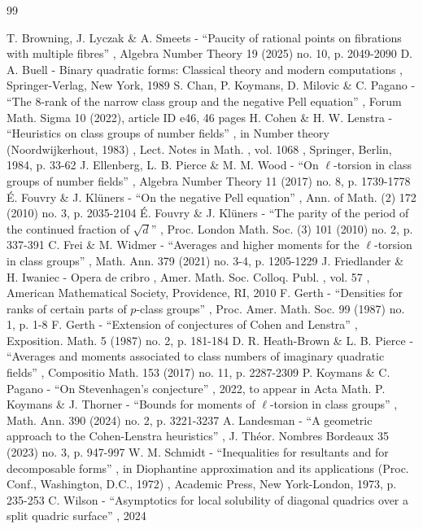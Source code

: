 \documentclass[11pt]{article}
\numberwithin{equation}{section}
\begin{document}
\begin{thebibliography}{99}\raggedright
{} T. Browning, J. Lyczak \& A. Smeets - “Paucity of rational points on fibrations with multiple fibres” , Algebra Number Theory 19 (2025) no. 10, p. 2049-2090
 D. A. Buell - Binary quadratic forms: Classical theory and modern computations , Springer-Verlag, New York, 1989
 S. Chan, P. Koymans, D. Milovic \& C. Pagano - “The 8-rank of the narrow class group and the negative Pell equation” , Forum Math. Sigma 10 (2022), article ID e46, 46 pages
 H. Cohen \& H. W. Lenstra - “Heuristics on class groups of number fields” , in Number theory (Noordwijkerhout, 1983) , Lect. Notes in Math. , vol. 1068 , Springer, Berlin, 1984, p. 33-62
 J. Ellenberg, L. B. Pierce \& M. M. Wood - “On $\ell $-torsion in class groups of number fields” , Algebra Number Theory 11 (2017) no. 8, p. 1739-1778
 É. Fouvry \& J. Klüners - “On the negative Pell equation” , Ann. of Math. (2) 172 (2010) no. 3, p. 2035-2104
 É. Fouvry \& J. Klüners - “The parity of the period of the continued fraction of $\sqrt{d}$” , Proc. London Math. Soc. (3) 101 (2010) no. 2, p. 337-391
 C. Frei \& M. Widmer - “Averages and higher moments for the $\ell $-torsion in class groups” , Math. Ann. 379 (2021) no. 3-4, p. 1205-1229
 J. Friedlander \& H. Iwaniec - Opera de cribro , Amer. Math. Soc. Colloq. Publ. , vol. 57 , American Mathematical Society, Providence, RI, 2010
 F. Gerth - “Densities for ranks of certain parts of $p$-class groups” , Proc. Amer. Math. Soc. 99 (1987) no. 1, p. 1-8
 F. Gerth - “Extension of conjectures of Cohen and Lenstra” , Exposition. Math. 5 (1987) no. 2, p. 181-184
 D. R. Heath-Brown \& L. B. Pierce - “Averages and moments associated to class numbers of imaginary quadratic fields” , Compositio Math. 153 (2017) no. 11, p. 2287-2309
 P. Koymans \& C. Pagano - “On Stevenhagen’s conjecture” , 2022, to appear in Acta Math.
 P. Koymans \& J. Thorner - “Bounds for moments of $\ell $-torsion in class groups” , Math. Ann. 390 (2024) no. 2, p. 3221-3237
 A. Landesman - “A geometric approach to the Cohen-Lenstra heuristics” , J. Théor. Nombres Bordeaux 35 (2023) no. 3, p. 947-997
 W. M. Schmidt - “Inequalities for resultants and for decomposable forms” , in Diophantine approximation and its applications (Proc. Conf., Washington, D.C., 1972) , Academic Press, New York-London, 1973, p. 235-253
 C. Wilson - “Asymptotics for local solubility of diagonal quadrics over a split quadric surface” , 2024
\end{thebibliography}
\end{document}
